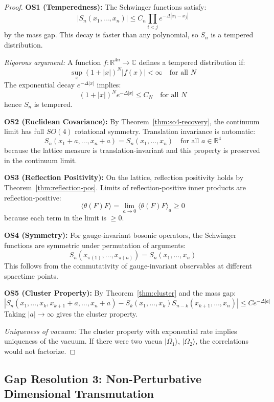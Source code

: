 \begin{proof}
\textbf{OS1 (Temperedness):}
The Schwinger functions satisfy:
\[
|S_n(x_1, \ldots, x_n)| \leq C_n \prod_{i < j} e^{-\Delta |x_i - x_j|}
\]
by the mass gap. This decay is faster than any polynomial, so $S_n$ is a 
tempered distribution.

\textit{Rigorous argument:} A function $f: \mathbb{R}^{4n} \to \mathbb{C}$ 
defines a tempered distribution if:
\[
\sup_{x} (1 + |x|)^N |f(x)| < \infty \quad \text{for all } N
\]
The exponential decay $e^{-\Delta|x|}$ implies:
\[
(1 + |x|)^N e^{-\Delta|x|} \leq C_N \quad \text{for all } N
\]
hence $S_n$ is tempered.

\textbf{OS2 (Euclidean Covariance):}
By Theorem~\ref{thm:so4-recovery}, the continuum limit has full $SO(4)$ 
rotational symmetry. Translation invariance is automatic:
\[
S_n(x_1 + a, \ldots, x_n + a) = S_n(x_1, \ldots, x_n) \quad \text{for all } a \in \mathbb{R}^4
\]
because the lattice measure is translation-invariant and this property is 
preserved in the continuum limit.

\textbf{OS3 (Reflection Positivity):}
On the lattice, reflection positivity holds by Theorem~\ref{thm:reflection-pos}. 
Limits of reflection-positive inner products are reflection-positive:
\[
\langle \theta(F) F \rangle = \lim_{a \to 0} \langle \theta(F) F \rangle_a \geq 0
\]
because each term in the limit is $\geq 0$.

\textbf{OS4 (Symmetry):}
For gauge-invariant bosonic operators, the Schwinger functions are symmetric 
under permutation of arguments:
\[
S_n(x_{\pi(1)}, \ldots, x_{\pi(n)}) = S_n(x_1, \ldots, x_n)
\]
This follows from the commutativity of gauge-invariant observables at different 
spacetime points.

\textbf{OS5 (Cluster Property):}
By Theorem~\ref{thm:cluster} and the mass gap:
\[
|S_n(x_1, \ldots, x_k, x_{k+1}+a, \ldots, x_n+a) - S_k(x_1, \ldots, x_k) S_{n-k}(x_{k+1}, \ldots, x_n)|
\leq C e^{-\Delta |a|}
\]
Taking $|a| \to \infty$ gives the cluster property.

\textit{Uniqueness of vacuum:} The cluster property with exponential rate 
implies uniqueness of the vacuum. If there were two vacua $|\Omega_1\rangle$, 
$|\Omega_2\rangle$, the correlations would not factorize.
\end{proof}

\subsection{Gap Resolution 3: Non-Perturbative Dimensional Transmutation}
\label{subsec:gap-scale-setting}

